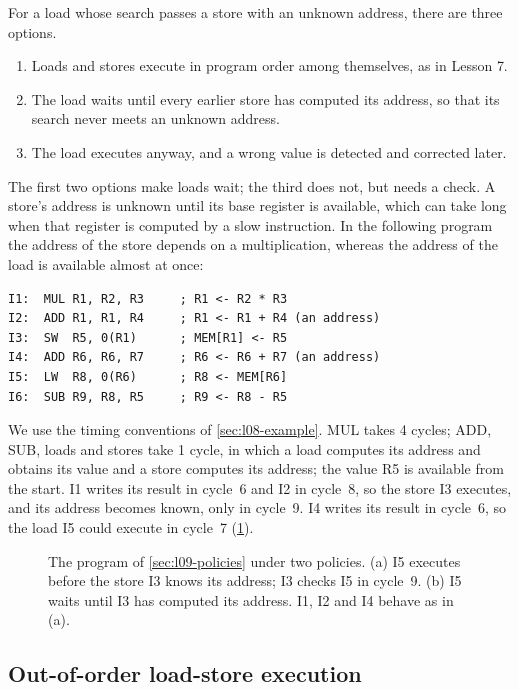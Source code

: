 \documentclass[../main.tex]{subfiles}
\begin{document}
For a load whose search passes a store with an unknown address, there are
three options.
\begin{enumerate}
  \item Loads and stores execute in program order among themselves, as in
    Lesson 7.
  \item The load waits until every earlier store has computed its address, so
    that its search never meets an unknown address.
  \item The load executes anyway, and a wrong value is detected and corrected
    later.
\end{enumerate}
The first two options make loads wait; the third does not, but needs a check.
A store's address is unknown until its base register is available, which can
take long when that register is computed by a slow instruction.  In the
following program the address of the store depends on a multiplication,
whereas the address of the load is available almost at once:
\begin{lstlisting}[language={[x86masm]Assembler}, numbers=none]
I1:  MUL R1, R2, R3     ; R1 <- R2 * R3
I2:  ADD R1, R1, R4     ; R1 <- R1 + R4 (an address)
I3:  SW  R5, 0(R1)      ; MEM[R1] <- R5
I4:  ADD R6, R6, R7     ; R6 <- R6 + R7 (an address)
I5:  LW  R8, 0(R6)      ; R8 <- MEM[R6]
I6:  SUB R9, R8, R5     ; R9 <- R8 - R5
\end{lstlisting}
We use the timing conventions of \cref{sec:l08-example}.  MUL takes 4 cycles;
ADD, SUB, loads and stores take 1 cycle, in which a load computes its address
and obtains its value and a store computes its address; the value R5 is
available from the start.  I1 writes its result in cycle~6 and I2 in cycle~8,
so the store I3 executes, and its address becomes known, only in cycle~9.  I4
writes its result in cycle~6, so the load I5 could execute in cycle~7
(\cref{fig:l09-policies}).

\begin{figure}[htbp]
  \centering
  
  \caption{The program of \cref{sec:l09-policies} under two policies.  (a) I5
    executes before the store I3 knows its address; I3 checks I5 in cycle~9.
    (b) I5 waits until I3 has computed its address.  I1, I2 and I4 behave as in
    (a).}
  \label{fig:l09-policies}
\end{figure}

\subsection{Out-of-order load-store execution}
\end{document}
